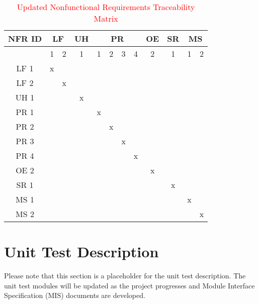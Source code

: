 \documentclass[12pt, titlepage]{article}
\begin{document}
\begin{landscape}
\begin{table}[H]
  \centering
  \begin{tabular}{|c|cc|c|cccc|c|c|cc|}
    \hline
    \multicolumn{1}{|c|}{\textbf{NFR ID}} & \multicolumn{2}{c|}{\textbf{LF}} & \textbf{UH} & \multicolumn{4}{c|}{\textbf{PR}} & \textbf{OE} & \textbf{SR} & \multicolumn{2}{c|}{\textbf{MS}} \\ 
    \hline
    & 1 & 2 & 1 & 1 & 2 & 3 & 4 & 2 & 1 & 1 & 2 \\ 
    \hline
    LF 1 & x &  &  &  &  &  &  &  &  &  &  \\ 
    \hline
    LF 2 &  & x &  &  &  &  &  &  &  &  &  \\ 
    \hline
    UH 1 &  &  & x &  &  &  &  &  &  &  &  \\ 
    \hline
    PR 1 &  &  &  & x &  &  &  &  &  &  &  \\ 
    \hline
    PR 2 &  &  &  &  & x &  &  &  &  &  &  \\ 
    \hline
    PR 3 &  &  &  &  &  & x &  &  &  &  &  \\ 
    \hline
    PR 4 &  &  &  &  &  &  & x &  &  &  &  \\ 
    \hline
    OE 2 &  &  &  &  &  &  &  & x &  &  &  \\ 
    \hline
    SR 1 &  &  &  &  &  &  &  &  & x &  &  \\ 
    \hline
    MS 1 &  &  &  &  &  &  &  &  &  & x &  \\ 
    \hline
    MS 2 &  &  &  &  &  &  &  &  &  &  & x \\ 
    \hline
  \end{tabular}
  \caption{\textcolor{red}{Updated Nonfunctional Requirements Traceability Matrix}}
  \label{tab:nf_requirements}
\end{table}





  \end{landscape}
  
\section{Unit Test Description}
Please note that this section is a placeholder for the unit test description. The unit test modules will be updated as the project progresses and Module Interface Specification (MIS) documents are developed.
\end{document}
